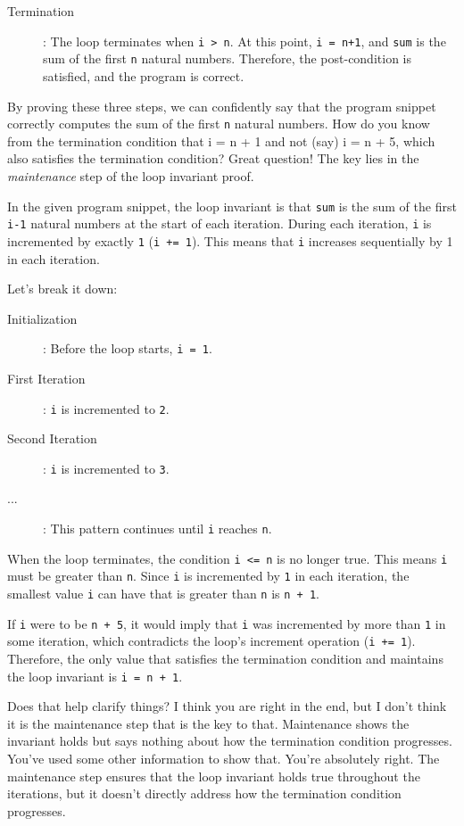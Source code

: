 \documentclass[twoside=false,DIV=14]{scrartcl}
\begin{document}
\begin{dialogue}
\begin{description}
  \item[Termination]: The loop terminates when \verb|i > n|. At this point, \verb|i = n+1|, and \verb|sum| is the sum of the first \verb|n| natural numbers. Therefore, the post-condition is satisfied, and the program is correct.
\end{description}
By proving these three steps, we can confidently say that the program snippet correctly computes the sum of the first \verb|n| natural numbers.
 How do you know from the termination condition that i = n + 1 and not (say) i = n + 5, which also satisfies the termination condition?
 Great question! The key lies in the \emph{maintenance} step of the loop invariant proof.

In the given program snippet, the loop invariant is that \verb|sum| is the sum of the first \verb|i-1| natural numbers at the start of each iteration. During each iteration, \verb|i| is incremented by exactly \verb|1| (\verb|i += 1|). This means that \verb|i| increases sequentially by 1 in each iteration.

Let's break it down:

\begin{description}
  \item[Initialization]: Before the loop starts, \verb|i = 1|.
  \item[First Iteration]: \verb|i| is incremented to \verb|2|.
  \item[Second Iteration]: \verb|i| is incremented to \verb|3|.
  \item[...]: This pattern continues until \verb|i| reaches \verb|n|.
\end{description}

When the loop terminates, the condition \verb|i <= n| is no longer true. This means \verb|i| must be greater than \verb|n|. Since \verb|i| is incremented by \verb|1| in each iteration, the smallest value \verb|i| can have that is greater than \verb|n| is \verb|n + 1|.

If \verb|i| were to be \verb|n + 5|, it would imply that \verb|i| was incremented by more than \verb|1| in some iteration, which contradicts the loop's increment operation (\verb|i += 1|). Therefore, the only value that satisfies the termination condition and maintains the loop invariant is \verb|i = n + 1|.

Does that help clarify things?
 I think you are right in the end, but I don't think it is the maintenance step that is the key to that. Maintenance shows the invariant holds but says nothing about how the termination condition progresses.  You've used some other information to show that.
 You're absolutely right. The maintenance step ensures that the loop invariant holds true throughout the iterations, but it doesn't directly address how the termination condition progresses.


\end{dialogue}
\end{document}
